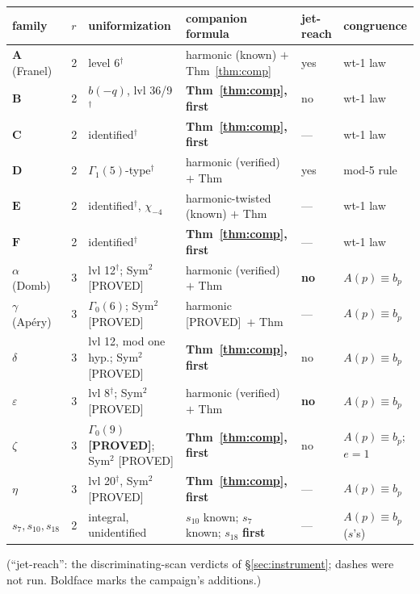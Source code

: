 \documentclass[11pt,reqno]{amsart}
\theoremstyle{plain}
\theoremstyle{definition}
\theoremstyle{remark}
\newcommand{\Proved}{\textup{\textsf{[PROVED]}}}
\begin{document}
\begin{center}\scriptsize
\setlength{\tabcolsep}{3pt}
\begin{tabular}{@{}llllll@{}}
\toprule
family & $r$ & uniformization & companion formula & jet-reach & congruence \\
\midrule
$\mathbf A$ (Franel) & 2 & level 6$^\dagger$ & harmonic (known) $+$ Thm~\ref{thm:comp} & yes & wt-1 law \\
$\mathbf B$ & 2 & $b(-q)$, lvl 36/9$^\dagger$ & \textbf{Thm~\ref{thm:comp}, first} & no & wt-1 law \\
$\mathbf C$ & 2 & identified$^\dagger$ & \textbf{Thm~\ref{thm:comp}, first} & --- & wt-1 law \\
$\mathbf D$ & 2 & $\Gamma_1(5)$-type$^\dagger$ & harmonic (verified) $+$ Thm & yes & mod-5 rule \\
$\mathbf E$ & 2 & identified$^\dagger$, $\chi_{-4}$ & harmonic-twisted (known) $+$ Thm & --- & wt-1 law \\
$\mathbf F$ & 2 & identified$^\dagger$ & \textbf{Thm~\ref{thm:comp}, first} & --- & wt-1 law \\
$\alpha$ (Domb) & 3 & lvl 12$^\dagger$; Sym$^2$ \Proved & harmonic (verified) $+$ Thm & \textbf{no} & $A(p)\equiv b_p$ \\
$\gamma$ (Ap\'ery) & 3 & $\Gamma_0(6)$; Sym$^2$ \Proved & harmonic \Proved\ $+$ Thm & --- & $A(p)\equiv b_p$ \\
$\delta$ & 3 & lvl 12, mod one hyp.; Sym$^2$ \Proved & \textbf{Thm~\ref{thm:comp}, first} & no & $A(p)\equiv b_p$ \\
$\varepsilon$ & 3 & lvl 8$^\dagger$; Sym$^2$ \Proved & harmonic (verified) $+$ Thm & \textbf{no} & $A(p)\equiv b_p$ \\
$\zeta$ & 3 & \textbf{$\Gamma_0(9)$ \Proved}; Sym$^2$ \Proved & \textbf{Thm~\ref{thm:comp}, first} & no & $A(p)\equiv b_p$; $e{=}1$ \\
$\eta$ & 3 & lvl 20$^\dagger$, Sym$^2$ \Proved & \textbf{Thm~\ref{thm:comp}, first} & --- & $A(p)\equiv b_p$ \\
$s_7,s_{10},s_{18}$ & 2 & integral, unidentified & $s_{10}$ known; $s_7$ known; $s_{18}$ \textbf{first} & --- & $A(p)\equiv b_p$ ($s$'s) \\
\bottomrule
\end{tabular}
\end{center}

(``jet-reach'': the discriminating-scan verdicts of
\S\ref{sec:instrument}; dashes were not run. Boldface marks the
campaign's additions.)
\end{document}
